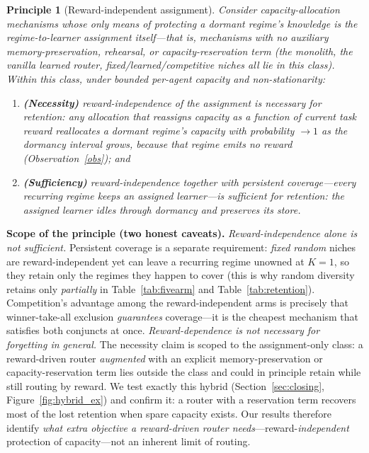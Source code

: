 \documentclass[10pt]{article}
\newtheorem{principle}{Principle}
\begin{document}
\begin{principle}[Reward-independent assignment]
\label{prin:ria}
Consider capacity-allocation mechanisms whose \emph{only} means of protecting a
dormant regime's knowledge is the regime-to-learner assignment itself---that is,
mechanisms with no auxiliary memory-preservation, rehearsal, or capacity-reservation
term (the monolith, the vanilla learned router, fixed/learned/competitive niches all
lie in this class). Within this class, under bounded per-agent capacity and
non-stationarity:
\begin{enumerate}[label=(\roman*), itemsep=1pt, topsep=2pt]
\item \textbf{(Necessity)} reward-independence of the assignment is \emph{necessary}
for retention: any allocation that reassigns capacity as a function of current task
reward reallocates a dormant regime's capacity with probability $\to 1$ as the
dormancy interval grows, because that regime emits no reward
(Observation~\ref{obs}); and
\item \textbf{(Sufficiency)} reward-independence \emph{together with persistent
coverage}---every recurring regime keeps an assigned learner---is \emph{sufficient}
for retention: the assigned learner idles through dormancy and preserves its store.
\end{enumerate}
\end{principle}

\noindent\textbf{Scope of the principle (two honest caveats).}
\emph{Reward-independence alone is not sufficient.} Persistent coverage is a separate
requirement: \emph{fixed random} niches are reward-independent yet can leave a
recurring regime unowned at $K{=}1$, so they retain only the regimes they happen to
cover (this is why random diversity retains only \emph{partially} in
Table~\ref{tab:fivearm} and Table~\ref{tab:retention}). Competition's advantage among
the reward-independent arms is precisely that winner-take-all exclusion
\emph{guarantees} coverage---it is the cheapest mechanism that satisfies both
conjuncts at once. \emph{Reward-dependence is not necessary for forgetting in
general.} The necessity claim is scoped to the assignment-only class: a reward-driven
router \emph{augmented} with an explicit memory-preservation or capacity-reservation
term lies outside the class and could in principle retain while still routing by
reward. We test exactly this hybrid (Section~\ref{sec:closing},
Figure~\ref{fig:hybrid_ex}) and confirm it: a router with a reservation term recovers
most of the lost retention when spare capacity exists. Our results therefore identify
\emph{what extra objective a reward-driven router needs}---reward-\emph{independent}
protection of capacity---not an inherent limit of routing.
\end{document}
